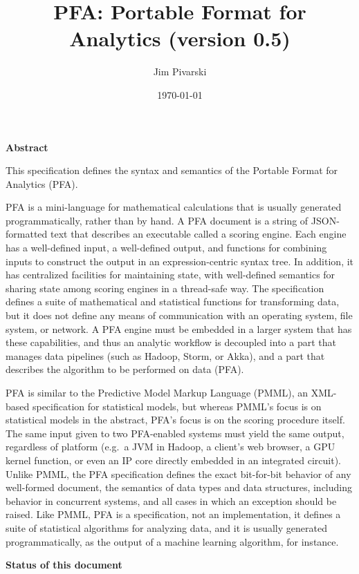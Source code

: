 \documentclass{article}
\title{PFA: Portable Format for Analytics (version 0.5)}
\author{Jim Pivarski}
\date{\today}
\theoremstyle{definition}
\begin{document}
\maketitle

{\large \bf Abstract}
\vspace{0.25 cm}

This specification defines the syntax and semantics of the Portable Format for Analytics (PFA).

PFA is a mini-language for mathematical calculations that is usually generated programmatically, rather than by hand.  A PFA document is a string of JSON-formatted text that describes an executable called a scoring engine.  Each engine has a well-defined input, a well-defined output, and functions for combining inputs to construct the output in an expression-centric syntax tree.  In addition, it has centralized facilities for maintaining state, with well-defined semantics for sharing state among scoring engines in a thread-safe way.  The specification defines a suite of mathematical and statistical functions for transforming data, but it does not define any means of communication with an operating system, file system, or network.  A PFA engine must be embedded in a larger system that has these capabilities, and thus an analytic workflow is decoupled into a part that manages data pipelines (such as Hadoop, Storm, or Akka), and a part that describes the algorithm to be performed on data (PFA).  

PFA is similar to the Predictive Model Markup Language (PMML), an XML-based specification for statistical models, but whereas PMML's focus is on statistical models in the abstract, PFA's focus is on the scoring procedure itself.  The same input given to two PFA-enabled systems must yield the same output, regardless of platform (e.g.\ a JVM in Hadoop, a client's web browser, a GPU kernel function, or even an IP core directly embedded in an integrated circuit).  Unlike PMML, the PFA specification defines the exact bit-for-bit behavior of any well-formed document, the semantics of data types and data structures, including behavior in concurrent systems, and all cases in which an exception should be raised.  Like PMML, PFA is a specification, not an implementation, it defines a suite of statistical algorithms for analyzing data, and it is usually generated programmatically, as the output of a machine learning algorithm, for instance.

\vspace{0.5 cm}
{\large \bf Status of this document}
\vspace{0.25 cm}
\end{document}
